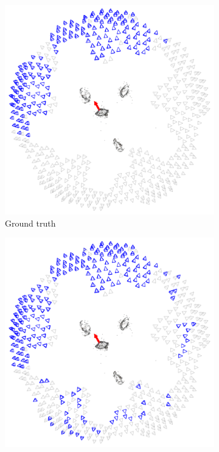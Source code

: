 \begin{figure}[t]
	\centering
	\begin{subfigure}{0.3\textwidth}
		\includegraphics[width=\textwidth]{figures/GT}
		\caption{Ground truth}
	\end{subfigure}
	\begin{subfigure}{0.3\textwidth}
		\includegraphics[width=\textwidth]{figures/AppOnly}

\end{subfigure}
\end{figure}
